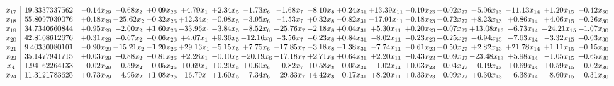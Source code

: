 \documentclass[9pt]{article}
\begin{document}
\[\begin{array}{c| c c@{\hskip 2pt} c@{\hskip 2pt} c@{\hskip 2pt} c@{\hskip 2pt} c@{\hskip 2pt} c@{\hskip 2pt} c@{\hskip 2pt} c@{\hskip 2pt} c@{\hskip 2pt} c@{\hskip 2pt} c@{\hskip 2pt} c@{\hskip 2pt} c@{\hskip 2pt} c@{\hskip 2pt} c@{\hskip 2pt} c@{\hskip 2pt} }
 x_{17}   &  19.3337337562 & -0.14 x_{29} & -0.68 x_{2} & +  0.09 x_{26} & +  4.79 x_{1} & +  2.34 x_{5} & -1.73 x_{6} & +  1.68 x_{7} & -8.10 x_{8} & +  0.24 x_{31} & + 13.39 x_{11} & -0.19 x_{23} & +  0.02 x_{27} & -5.06 x_{13} & -11.13 x_{14} & +  1.29 x_{15} & -0.42 x_{30}\\
 x_{18}   &  55.8097939076 & +  0.18 x_{29} & -25.62 x_{2} & -0.32 x_{26} & + 12.34 x_{1} & -0.98 x_{5} & -3.95 x_{6} & -1.53 x_{7} & +  0.32 x_{8} & -0.82 x_{31} & -17.91 x_{11} & -0.18 x_{23} & +  0.72 x_{27} & +  8.23 x_{13} & +  0.86 x_{14} & +  4.06 x_{15} & -0.26 x_{30}\\
 x_{19}   &  34.7340660844 & +  0.95 x_{29} & -2.00 x_{2} & +  1.60 x_{26} & -33.96 x_{1} & -3.84 x_{5} & -8.52 x_{6} & + 25.76 x_{7} & -2.18 x_{8} & +  0.04 x_{31} & +  5.30 x_{11} & +  0.20 x_{23} & +  0.07 x_{27} & + 13.08 x_{13} & -6.73 x_{14} & -24.21 x_{15} & -1.07 x_{30}\\
 x_{20}   &  42.8108612676 & +  0.31 x_{29} & -0.67 x_{2} & -0.06 x_{26} & +  4.67 x_{1} & +  9.36 x_{5} & -12.16 x_{6} & -3.56 x_{7} & -6.23 x_{8} & +  0.84 x_{31} & -8.02 x_{11} & -0.23 x_{23} & +  0.25 x_{27} & -6.94 x_{13} & -7.63 x_{14} & -3.32 x_{15} & +  0.03 x_{30}\\
 x_{21}   &  9.40330080101 & -0.90 x_{29} & -15.21 x_{2} & -1.20 x_{26} & + 29.13 x_{1} & -5.15 x_{5} & +  7.75 x_{6} & -17.85 x_{7} & -3.18 x_{8} & -1.38 x_{31} & -7.74 x_{11} & -0.61 x_{23} & +  0.50 x_{27} & +  2.82 x_{13} & + 21.78 x_{14} & +  1.11 x_{15} & -0.15 x_{30}\\
 x_{22}   &  35.1477941715 & +  0.03 x_{29} & +  0.88 x_{2} & -0.81 x_{26} & +  2.28 x_{1} & -0.10 x_{5} & -20.19 x_{6} & -17.18 x_{7} & +  2.71 x_{8} & +  0.64 x_{31} & +  2.20 x_{11} & -0.43 x_{23} & -0.09 x_{27} & -23.48 x_{13} & +  5.98 x_{14} & -1.05 x_{15} & +  0.65 x_{30}\\
 x_{4}   &  1.94162264133 & -0.02 x_{29} & -0.59 x_{2} & -0.05 x_{26} & +  0.69 x_{1} & +  0.20 x_{5} & +  0.60 x_{6} & -0.82 x_{7} & +  0.58 x_{8} & -0.05 x_{31} & -1.02 x_{11} & +  0.03 x_{23} & +  0.04 x_{27} & -0.19 x_{13} & +  0.69 x_{14} & +  0.59 x_{15} & +  0.02 x_{30}\\
 x_{24}   &  11.3121783625 & +  0.73 x_{29} & +  4.95 x_{2} & +  1.08 x_{26} & -16.79 x_{1} & +  1.60 x_{5} & -7.34 x_{6} & + 29.33 x_{7} & +  4.42 x_{8} & -0.17 x_{31} & +  8.20 x_{11} & +  0.33 x_{23} & -0.09 x_{27} & +  0.30 x_{13} & -6.38 x_{14} & -8.60 x_{15} & -0.31 x_{30}\\

\end{array}\]
\end{document}
